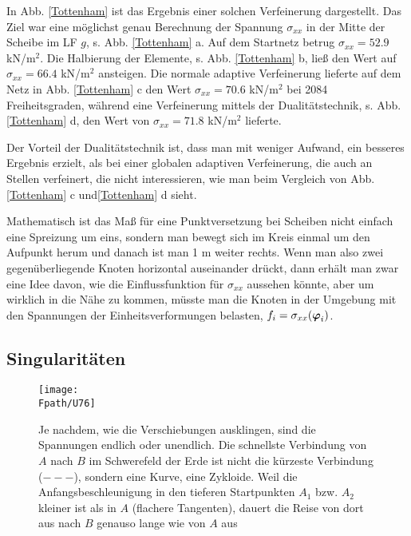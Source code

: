 {{In Abb. \ref{Tottenham} ist das Ergebnis einer solchen Verfeinerung dargestellt. Das Ziel war eine m\"{o}glichst genau Berechnung der Spannung $\sigma_{xx}$ in der Mitte der Scheibe im LF $g$, s. Abb. \ref{Tottenham} a. Auf dem Startnetz betrug $\sigma_{xx} = 52.9$ kN/m$^2$. Die Halbierung der Elemente, s. Abb. \ref{Tottenham} b, lie{\ss} den Wert auf $\sigma_{xx} = 66.4$ kN/m$^2$ ansteigen. Die normale adaptive Verfeinerung lieferte auf dem Netz in Abb. \ref{Tottenham} c den Wert $\sigma_{xx} = 70.6$ kN/m$^2$ bei 2084 Freiheitsgraden, w\"{a}hrend eine Verfeinerung mittels der Dualit\"{a}tstechnik, s. Abb. \ref{Tottenham} d, den Wert von $\sigma_{xx} = 71.8$ kN/m$^2$ lieferte.

Der Vorteil der Dualit\"{a}tstechnik ist, dass man mit weniger Aufwand, ein besseres Ergebnis erzielt, als bei einer globalen adaptiven Verfeinerung, die auch an Stellen verfeinert, die nicht interessieren, wie man beim Vergleich von Abb. \ref{Tottenham} c und\ref{Tottenham} d sieht.\\

\begin{remark}
Mathematisch ist das Ma{\ss} f\"{u}r eine Punktversetzung bei Scheiben nicht einfach eine Spreizung um eins, sondern man bewegt sich im Kreis einmal um den Aufpunkt herum und danach ist man 1 m weiter rechts. Wenn man also zwei gegen\"{u}berliegende Knoten horizontal auseinander dr\"{u}ckt, dann erh\"{a}lt man zwar eine  Idee davon, wie die Einflussfunktion f\"{u}r $\sigma_{xx}$ aussehen k\"{o}nnte, aber um wirklich in die N\"{a}he zu kommen, m\"{u}sste man die Knoten in der Umgebung mit den Spannungen der Einheitsverformungen belasten, $f_i = \sigma_{xx}(\mbox{\boldmath $\varphi$}_i)$.
\end{remark}

\vspace{-0.7cm}
{\textcolor{sectionTitleBlue}{\section{Singularit\"{a}ten}}}\label{Singularitaeten}
\begin{figure}[tbp] \centering
\centering
\if {} \sidecaption \fi
\texttt{[image: \\Fpath/U76]}
\caption{Je nachdem, wie die Verschiebungen ausklingen, sind die Spannungen endlich oder
unendlich. Die schnellste Verbindung von $A$ nach $B$ im Schwerefeld der Erde ist nicht die k\"{u}rzeste Verbindung ($---$), sondern eine Kurve, eine Zykloide. Weil die Anfangsbeschleunigung in den tieferen Startpunkten $A_1$ bzw. $A_2$ kleiner ist als in $A$ (flachere Tangenten), dauert die Reise von dort aus nach $B$ genauso lange wie von $A$ aus} \label{U76}
\end{figure}%

}}

